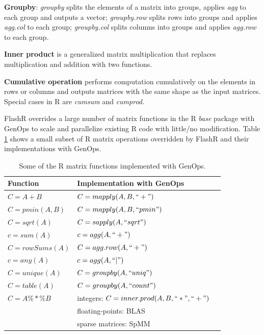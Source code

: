 \noindent \textbf{Groupby}: \textit{groupby} splits the elements of a matrix
into groups, applies \textit{agg} to each group and outputs a vector;
\textit{groupby.row} splits rows into groups and applies \textit{agg.col}
to each group; \textit{groupby.col} splits columns into groups and applies
\textit{agg.row} to each group.

\noindent \textbf{Inner product} is a generalized matrix multiplication
that replaces multiplication and addition with two functions.

\noindent \textbf{Cumulative operation} performs computation cumulatively
on the elements in rows or columns and outputs matrices with the same
shape as the input matrices. Special cases in R are \textit{cumsum} and
\textit{cumprod}.

FlashR overrides a large number of matrix functions in the R \textit{base}
package with GenOps to scale and parallelize
existing R code with little/no modification. Table \ref{tbl:Rfuns} shows
a small subset of R matrix operations overridden by FlashR and their
implementations with GenOps.

\begin{table}
\begin{center}
\caption{Some of the R matrix functions implemented with GenOps.}
\vspace{-10pt}
\footnotesize
\begin{tabular}{|l|l|l|}
\hline
Function & Implementation with GenOps \\
\hline
$C=A+B$ & $C=mapply(A, B, ``+")$ \\
$C=pmin(A,B)$ & $C=mapply(A, B, ``pmin")$ \\
$C=sqrt(A)$ & $C=sapply(A, ``sqrt")$ \\
\hline
$c=sum(A)$ & $c=agg(A, ``+")$ \\
$C=rowSums(A)$ & $C=agg.row(A, ``+")$ \\
$c=any(A)$ & $c=agg(A, ``|")$ \\
\hline
$C=unique(A)$ & $C=groupby(A, ``uniq")$ \\
$C=table(A)$ & $C=groupby(A, ``count")$ \\
\hline
$C=A \%*\% B$ & integers: $C=inner.prod(A, B, ``*", ``+")$ \\
 & floating-points: BLAS \\
 & sparse matrices: SpMM \cite{SEM_SpMM} \\
\hline
\end{tabular}
\normalsize
\label{tbl:Rfuns}
\end{center}
\end{table}

